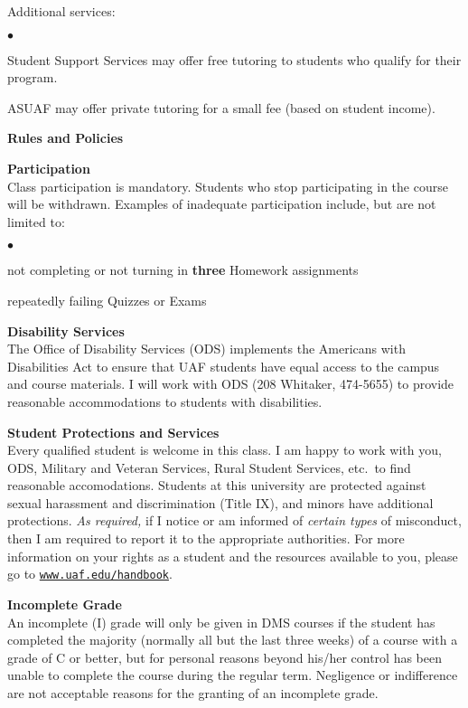 \documentclass[12pt]{article}
\renewcommand{\emph}[1]{\textsf{\textbf{#1}}}
\newcommand{\localhead}[1]{\par\smallskip\textbf{#1}\nobreak\\}%
\def\heading#1{\localhead{\large\emph{#1}}}
\def\subheading#1{\localhead{\emph{#1}}}
\newenvironment{clist}%
{\bgroup\parskip 0pt\begin{list}{$\bullet$}{\partopsep 4pt\topsep 0pt\itemsep -2pt}}%
{\end{list}\egroup}%
\begin{document}
Additional services:
\begin{clist}
	\item Student Support Services may offer free tutoring to students who qualify for their program.
	\item ASUAF may offer private tutoring for a small fee (based on student income).
\end{clist}


\bigskip
\heading{Rules and Policies}
\vskip -15pt
\subheading{Participation}
Class participation is mandatory.  Students who stop participating in the course will be withdrawn.  Examples of inadequate participation include, but are not limited to:

\begin{clist}
\item not completing or not turning in \textbf{three} Homework assignments
\item repeatedly failing Quizzes or Exams
\end{clist}

\subheading{Disability Services}
The Office of Disability Services (ODS) implements the Americans with Disabilities Act to ensure that UAF students have equal access to the campus and course materials.  I will work with ODS (208 Whitaker, 474-5655) to provide reasonable accommodations to students with disabilities.

\subheading{Student Protections and Services}
Every qualified student is welcome in this class.  I am happy to work with you, ODS, Military and Veteran Services, Rural Student Services, etc.~to find reasonable accomodations.  Students at this university are protected against sexual harassment and discrimination (Title IX), and minors have additional protections. \textit{As required,} if I notice or am informed of \textit{certain types} of misconduct, then I am required to report it to the appropriate authorities.  For more information on your rights as a student and the resources available to you, please go to \href{https://www.uaf.edu/handbook/}{\texttt{www.uaf.edu/handbook}}.

\subheading{Incomplete Grade} 
An incomplete (I) grade will only be given in DMS courses if the student has completed the majority (normally all but the last three weeks) of a course with a grade of C or better, but for personal reasons beyond his/her control has been unable to complete the course during the regular term. Negligence or indifference are not acceptable reasons for the granting of an incomplete grade. 
\end{document}
